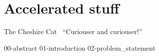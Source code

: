 \chapter{\label{ch:accelerator}Accelerated stuff}

\begin{frontquote}{The Cheshire Cat~\cite{wonderland}}
  ``Curiouser and curiouser!''
\end{frontquote}

{00-abstract}
{01-introduction}
{02-problem_statement}

